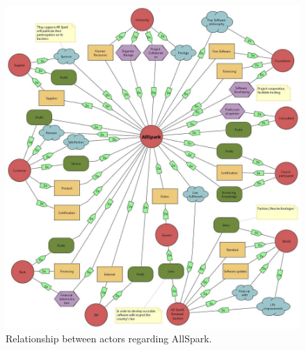\begin{figure}
\centering
\includegraphics[scale=0.45]{Si_star/img/i_star_vertical}
\caption{Relationship between actors regarding AllSpark.}
\label{img:i_star}
\end{figure}


